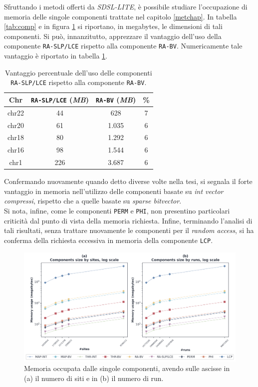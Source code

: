 Sfruttando i metodi offerti da \textit{SDSL-LITE}, è possibile studiare
l'occupazione di memoria delle singole componenti trattate nel capitolo
\ref{metchap}. 
In tabella \ref{tab:comp} e in figura \ref{fig:comp}
si riportano, in megabytes, 
le dimensioni di tali componenti. Si può,
innanzitutto, apprezzare il vantaggio dell'uso della componente
\texttt{RA-SLP/LCE} rispetto alla 
componente \texttt{RA-BV}. Numericamente tale vantaggio è riportato in tabella
\ref{tab:slppanel}.
\begin{table}
  \centering
  \caption{Vantaggio percentuale dell'uso delle componenti \texttt{RA-SLP/LCE}
    rispetto alla componente \texttt{RA-BV}.}
  \begin{tabular}{c||c|c|c}
    \textbf{Chr} & \textbf{\texttt{RA-SLP/LCE}
                                          (\textit{MB})}
    & \textbf{\texttt{RA-BV} (\textit{MB})} & \textbf{\%}\\
    \hline
    \hline
    chr22 & 44 & 628 & 7\\
    chr20 & 61 & 1.035 & 6\\
    chr18 & 80 & 1.292 & 6\\
    chr16 & 98 & 1.544 & 6\\
    chr1 & 226 & 3.687 & 6\\
  \end{tabular}
  \label{tab:slppanel}
\end{table}
Confermando nuovamente quando detto diverse volte nella tesi, si segnala il
forte vantaggio in memoria nell'utilizzo delle componenti basate su \textit{int
  vector compressi}, rispetto che a quelle basate su \textit{sparse
  bitvector}.\\
Si nota, infine, come le componenti \texttt{PERM} e \texttt{PHI}, non
presentino particolari criticità dal punto di vista della memoria
richiesta. Infine, terminando l'analisi di tali risultati, senza trattare
nuovamente le componenti per il \textit{random access}, si ha conferma della
richiesta eccessiva in memoria della componente \texttt{LCP}.
\begin{figure}
  \centering
    \includegraphics[width=\linewidth]{img/comp_mem.png}
  \caption{Memoria occupata dalle singole componenti, avendo sulle ascisse in
    (a) il numero di siti e in (b) il numero di run. }
  \label{fig:comp}
\end{figure}
